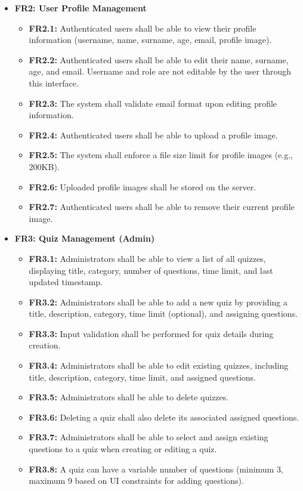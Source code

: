 \begin{itemize}
    \item \textbf{FR2: User Profile Management}
    \begin{itemize}
        \item \textbf{FR2.1:} Authenticated users shall be able to view their profile information (username, name, surname, age, email, profile image).
        \item \textbf{FR2.2:} Authenticated users shall be able to edit their name, surname, age, and email. Username and role are not editable by the user through this interface.
        \item \textbf{FR2.3:} The system shall validate email format upon editing profile information.
        \item \textbf{FR2.4:} Authenticated users shall be able to upload a profile image.
        \item \textbf{FR2.5:} The system shall enforce a file size limit for profile images (e.g., 200KB).
        \item \textbf{FR2.6:} Uploaded profile images shall be stored on the server.
        \item \textbf{FR2.7:} Authenticated users shall be able to remove their current profile image.
    \end{itemize}

    \item \textbf{FR3: Quiz Management (Admin)}
    \begin{itemize}
        \item \textbf{FR3.1:} Administrators shall be able to view a list of all quizzes, displaying title, category, number of questions, time limit, and last updated timestamp.
        \item \textbf{FR3.2:} Administrators shall be able to add a new quiz by providing a title, description, category, time limit (optional), and assigning questions.
        \item \textbf{FR3.3:} Input validation shall be performed for quiz details during creation.
        \item \textbf{FR3.4:} Administrators shall be able to edit existing quizzes, including title, description, category, time limit, and assigned questions.
        \item \textbf{FR3.5:} Administrators shall be able to delete quizzes.
        \item \textbf{FR3.6:} Deleting a quiz shall also delete its associated assigned questions.
        \item \textbf{FR3.7:} Administrators shall be able to select and assign existing questions to a quiz when creating or editing a quiz.
        \item \textbf{FR3.8:} A quiz can have a variable number of questions (minimum 3, maximum 9 based on UI constraints for adding questions).
    \end{itemize}


\end{itemize}

